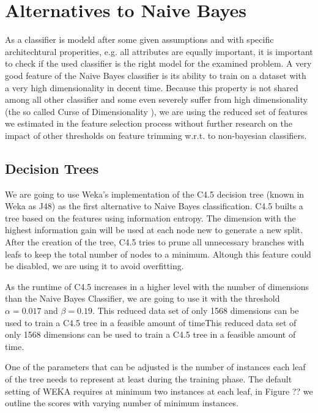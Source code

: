 \section{Alternatives to Naive Bayes}
As a classifier is modeld after some given assumptions and with specific architechtural properities, e.g. all attributes are equally important, it is important to check if the used classifier is the right model for the examined problem.
A very good feature of the Naive Bayes classifier is its ability to train on a dataset with a very high dimensionality in decent time.
Because this property is not shared among all other classifier and some even severely suffer from high dimensionality (the so called Curse of Dimensionality \cite{bellman1957dynamic}), we are using the reduced set of features we estimated in the feature selection process without further research on the impact of other thresholds on feature trimming w.r.t. to non-bayesian classifiers.

\subsection{Decision Trees}

We are going to use Weka's \cite{hall2009weka} implementation of the C4.5 decision tree \cite{Quinlan1993} (known in Weka as J48) as the first alternative to Naive Bayes classification.
C4.5 builts a tree based on the features using information entropy.
The dimension with the highest information gain will be used at each node new to generate a new split.
After the creation of the tree, C4.5 tries to prune all unnecessary branches with leafs to keep the total number of nodes to a minimum.
Altough this feature could be disabled, we are using it to avoid overfitting.

As the runtime of C4.5 increases in a higher level with the number of dimensions than the Naive Bayes Classifier, we are going to use it with the threshold $\alpha=0.017$ and $\beta=0.19$.
This reduced data set of only 1568 dimensions can be used to train a C4.5 tree in a feasible amount of timeThis reduced data set of only 1568 dimensions can be used to train a C4.5 tree in a feasible amount of time.



One of the parameters that can be adjusted is the number of instances each leaf of the tree needs to represent at least during the training phase.
The default setting of WEKA requires at minimum two instances at each leaf, in Figure ?? we outline the scores with varying number of minimum instances.



